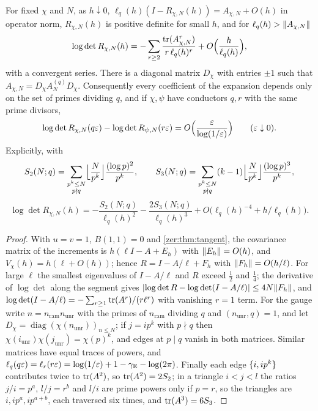 \begin{theorem}\label{zer:thm:det}
For fixed $\chi$ and $N$, as $h\downarrow0$, $\ell_q(h)(I-R_{\chi,N}(h))=A_{\chi,N}+O(h)$ in operator
norm, $R_{\chi,N}(h)$ is positive definite for small $h$, and for $\ell_q(h)>\lVert A_{\chi,N}\rVert$
\[
 \log\det R_{\chi,N}(h)=-\sum_{r\ge2}\frac{\operatorname{tr}(A_{\chi,N}^r)}{r\,\ell_q(h)^r}+O\Bigl(\frac h{\ell_q(h)}\Bigr),
\]
with a convergent series. There is a diagonal matrix $D_\chi$ with entries $\pm1$ such that
$A_{\chi,N}=D_\chi A^{(q)}_ND_\chi$. Consequently every coefficient of the expansion depends only on
the set of primes dividing $q$, and if $\chi,\psi$ have conductors $q,r$ with the same prime
divisors,
\[
 \log\det R_{\chi,N}(q\varepsilon)-\log\det R_{\psi,N}(r\varepsilon)=O\Bigl(\frac{\varepsilon}{\log(1/\varepsilon)}\Bigr)\qquad(\varepsilon\downarrow0).
\]
Explicitly, with
\[
 S_2(N;q)=\sum_{\substack{p^k\le N\\p\nmid q}}\Bigl\lfloor\frac N{p^k}\Bigr\rfloor\frac{(\log p)^2}{p^k},\qquad
 S_3(N;q)=\sum_{\substack{p^k\le N\\p\nmid q}}(k-1)\Bigl\lfloor\frac N{p^k}\Bigr\rfloor\frac{(\log p)^3}{p^k},
\]
\[
 \log\det R_{\chi,N}(h)=-\frac{S_2(N;q)}{\ell_q(h)^2}-\frac{2S_3(N;q)}{\ell_q(h)^3}
 +O\bigl(\ell_q(h)^{-4}+h/\ell_q(h)\bigr).
\]
\end{theorem}
\begin{proof}
With $u=v=1$, $B(1,1)=0$ and \cref{zer:thm:tangent}, the covariance matrix of the increments is
$h(\ell I-A+E_h)$ with $\lVert E_h\rVert=O(h)$, and $V_\chi(h)=h(\ell+O(h))$; hence
$R=I-A/\ell+F_h$ with $\lVert F_h\rVert=O(h/\ell)$. For large $\ell$ the smallest eigenvalues of $I-A/\ell$
and $R$ exceed $\tfrac12$ and $\tfrac14$; the derivative of $\log\det$ along the segment gives
$\lvert\log\det R-\log\det(I-A/\ell)\rvert\le4N\lVert F_h\rVert$, and
$\log\det(I-A/\ell)=-\sum_{r\ge1}\operatorname{tr}(A^r)/(r\ell^r)$ with vanishing $r=1$ term. For the gauge write
$n=n_{\mathrm{ram}}n_{\mathrm{unr}}$ with the primes of $n_{\mathrm{ram}}$ dividing $q$ and
$(n_{\mathrm{unr}},q)=1$, and let $D_\chi=\operatorname{diag}(\chi(n_{\mathrm{unr}}))_{n\le N}$; if $j=ip^k$
with $p\nmid q$ then $\chi(i_{\mathrm{unr}})\chi(j_{\mathrm{unr}})=\chi(p)^k$, and edges at $p\mid q$ vanish
in both matrices. Similar matrices have equal traces of powers, and
$\ell_q(q\varepsilon)=\ell_r(r\varepsilon)=\log(1/\varepsilon)+1-\gamma_{\mathrm{E}}-\log(2\pi)$. Finally each edge $\{i,ip^k\}$
contributes twice to $\operatorname{tr}(A^2)$, so $\operatorname{tr}(A^2)=2S_2$; in a triangle $i<j<l$ the ratios $j/i=p^a$,
$l/j=r^b$ and $l/i$ are prime powers only if $p=r$, so the triangles are $i,ip^a,ip^{a+b}$, each
traversed six times, and $\operatorname{tr}(A^3)=6S_3$.
\end{proof}

